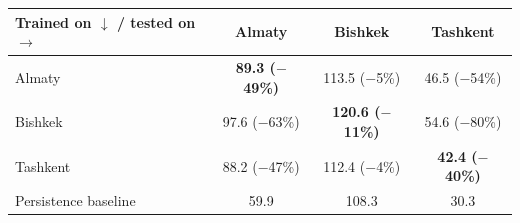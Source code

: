 \begin{tabular}{@{}lccc@{}}
\toprule
\textbf{Trained on} $\downarrow$ / \textbf{tested on} $\rightarrow$ & \textbf{Almaty} & \textbf{Bishkek} & \textbf{Tashkent} \\
\midrule
Almaty & \textbf{89.3 ($-$49\%)} & 113.5 ($-$5\%) & 46.5 ($-$54\%) \\
Bishkek & 97.6 ($-$63\%) & \textbf{120.6 ($-$11\%)} & 54.6 ($-$80\%) \\
Tashkent & 88.2 ($-$47\%) & 112.4 ($-$4\%) & \textbf{42.4 ($-$40\%)} \\
\midrule
Persistence baseline & 59.9 & 108.3 & 30.3 \\
\bottomrule
\end{tabular}
